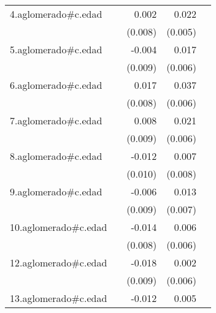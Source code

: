 {\begin{longtable}{l*{4}{D{.}{.}{-1}}}
\addlinespace
4.aglomerado#c.edad&                     &       0.002         &       0.022\sym{***}&                     \\
            &                     &     (0.008)         &     (0.005)         &                     \\
\addlinespace
5.aglomerado#c.edad&                     &      -0.004         &       0.017\sym{**} &                     \\
            &                     &     (0.009)         &     (0.006)         &                     \\
\addlinespace
6.aglomerado#c.edad&                     &       0.017\sym{*}  &       0.037\sym{***}&                     \\
            &                     &     (0.008)         &     (0.006)         &                     \\
\addlinespace
7.aglomerado#c.edad&                     &       0.008         &       0.021\sym{***}&                     \\
            &                     &     (0.009)         &     (0.006)         &                     \\
\addlinespace
8.aglomerado#c.edad&                     &      -0.012         &       0.007         &                     \\
            &                     &     (0.010)         &     (0.008)         &                     \\
\addlinespace
9.aglomerado#c.edad&                     &      -0.006         &       0.013         &                     \\
            &                     &     (0.009)         &     (0.007)         &                     \\
\addlinespace
10.aglomerado#c.edad&                     &      -0.014         &       0.006         &                     \\
            &                     &     (0.008)         &     (0.006)         &                     \\
\addlinespace
12.aglomerado#c.edad&                     &      -0.018\sym{*}  &       0.002         &                     \\
            &                     &     (0.009)         &     (0.006)         &                     \\
\addlinespace
13.aglomerado#c.edad&                     &      -0.012         &       0.005         &                     \\

\end{longtable}}
